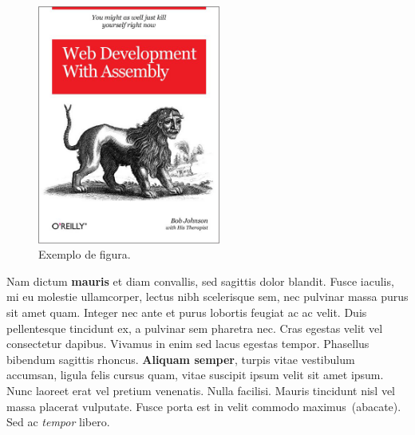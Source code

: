 \documentclass[11pt,twocolumn]{article}
\begin{document}
\begin{figure}[h]
  \centering
  \includegraphics[width=6cm]{exemplo.jpg}
 \caption{Exemplo de figura.}
 \label{fig_exemplo}
\end{figure}

Nam dictum \textbf{mauris} et diam convallis, sed sagittis dolor blandit. Fusce iaculis, mi eu molestie ullamcorper, lectus nibh scelerisque sem, nec pulvinar massa purus sit amet quam. Integer nec ante et purus lobortis feugiat ac ac velit. Duis pellentesque tincidunt ex, a pulvinar sem pharetra nec. Cras egestas velit vel consectetur dapibus. Vivamus in enim sed lacus egestas tempor. Phasellus bibendum sagittis rhoncus. \textbf{Aliquam semper}, turpis vitae vestibulum accumsan, ligula felis cursus quam, vitae suscipit ipsum velit sit amet ipsum. Nunc laoreet erat vel pretium venenatis. Nulla facilisi. Mauris tincidunt nisl vel massa placerat vulputate. Fusce porta est in velit commodo maximus~(abacate). Sed ac \textit{tempor} libero.
\end{document}
